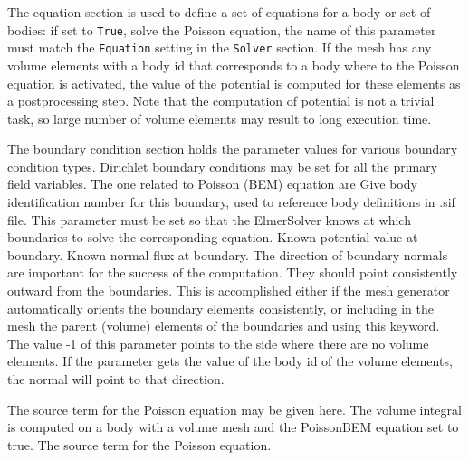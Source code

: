 The equation section is used to define a set of equations for a body or set of bodies:
\sifbegin
{} if set to {\tt True}, solve the Poisson equation,
the name of this parameter must match the {\tt Equation} setting in the {\tt Solver} section.
\sifend
If the mesh has any volume elements with a body id that corresponds to a body where to
the Poisson equation is activated, the value of the potential is computed for these elements
as a postprocessing step. Note that the computation of potential is not a trivial task,
so large number of volume elements may result to long execution time.

The boundary condition section holds the parameter values for various
boundary condition types. Dirichlet boundary conditions may be
set for all the primary field variables. The one related to Poisson (BEM) equation
are
\sifbegin
{}
Give body identification number for this boundary, used to reference
body definitions in .sif file. This parameter must be set so that the ElmerSolver
knows at which boundaries to solve the corresponding equation.
Known potential value at boundary.
Known normal flux at boundary.
The direction of boundary normals are important for the success of the computation. They
should point consistently outward from the boundaries. This is accomplished either if
the mesh generator automatically orients the boundary elements consistently, or including
in the mesh the parent (volume) elements of the boundaries and using this keyword. The value
-1 of this parameter points to the side where there are no volume elements. If the parameter
gets the value of the body id of the volume elements, the normal will point to that direction.
\sifend

The source term for the Poisson equation may be given here. The volume integral
is computed on a body with a volume mesh and the PoissonBEM equation set to true.
\sifbegin
{}
The source term for the Poisson equation.
\sifend
\sifend


%
%

